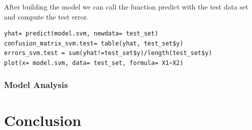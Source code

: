 \documentclass[]{report}
\begin{document}
After building the model we can call the function predict with the test data set and compute the test error.
\begin{lstlisting}
yhat= predict(model.svm, newdata= test_set)
confusion_matrix_svm.test= table(yhat, test_set$y)
errors_svm.test = sum(yhat!=test_set$y)/length(test_set$y)
plot(x= model.svm, data= test_set, formula= X1~X2)
\end{lstlisting}

\subsubsection{Model Analysis}

\section{Conclusion}
\end{document}
